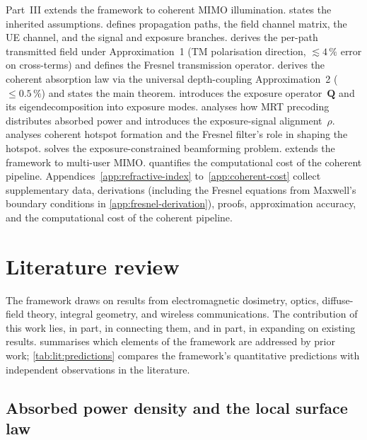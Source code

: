 \documentclass[11pt,a4paper]{article}
\theoremstyle{definition}      %
\begin{document}
Part~III extends the framework to coherent MIMO illumination.
 states the inherited assumptions.
 defines propagation paths, the field channel
matrix, the UE channel, and the signal and exposure branches.
 derives the per-path transmitted field
under Approximation~1 (TM polarisation direction, $\lesssim 4\,\%$
error on cross-terms) and defines the Fresnel transmission operator.
 derives the coherent absorption law
via the universal depth-coupling Approximation~2
($\leq 0.5\,\%$) and states the main theorem.
 introduces the exposure
operator~$\mathbf{Q}$ and its eigendecomposition into exposure modes.
 analyses how MRT precoding distributes
absorbed power and introduces the exposure-signal alignment~$\rho$.
 analyses coherent hotspot formation and
the Fresnel filter's role in shaping the hotspot.
 solves the exposure-constrained beamforming problem.
 extends the framework to multi-user MIMO.
 quantifies the computational cost of the
coherent pipeline.
Appendices~\ref{app:refractive-index} to~\ref{app:coherent-cost}
collect supplementary data, derivations (including the Fresnel equations
from Maxwell's boundary conditions in
\cref{app:fresnel-derivation}), proofs, approximation accuracy, and
the computational cost of the coherent pipeline.\relax

\section{Literature review}\label{sec:literature}

The framework draws on results from electromagnetic dosimetry, optics,
diffuse-field theory, integral geometry, and wireless communications.
The contribution of this work lies, in part, in connecting them, and in part, 
in expanding on existing results.
 summarises which elements of the framework
are addressed by prior work;
\cref{tab:lit:predictions} compares the framework's quantitative
predictions with independent observations in the literature.

\subsection{Absorbed power density and the local surface law}
\end{document}

